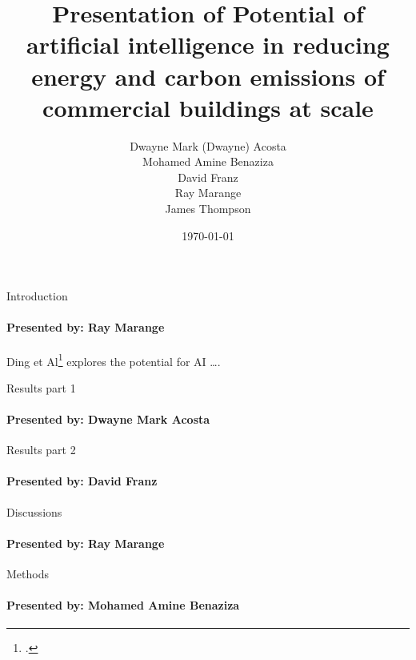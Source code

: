 \documentclass{beamer}
\title{Presentation of Potential of artificial intelligence in reducing energy and carbon emissions of commercial buildings at scale}
\author{Dwayne Mark (Dwayne) Acosta \\ Mohamed Amine Benaziza \\ David Franz \\ Ray Marange \\ James Thompson}
\date{\today}
\begin{document}
\frame{\titlepage}

\begin{frame}{Introduction}
\framesubtitle{Presented by: Ray Marange}
Ding et Al\footcite{dingPotentialArtificialIntelligence2024} explores the potential for AI \dots.

\end{frame}

\begin{frame}{Results part 1}
\framesubtitle{Presented by: Dwayne Mark Acosta}

\end{frame}

\begin{frame}{Results part 2}
\framesubtitle{Presented by: David Franz}


\end{frame}

\begin{frame}{Discussions}
\framesubtitle{Presented by: Ray Marange}

\end{frame}

\begin{frame}{Methods}
\framesubtitle{Presented by: Mohamed Amine Benaziza}

\end{frame}
\end{document}
